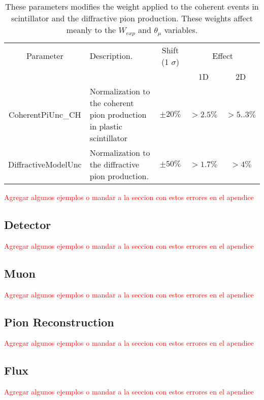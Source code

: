 \begin{table}[!htb]
    \centering
    \begin{tabular}{c|p{2in}|c|c|c}
        \hline 
        Parameter & Description.  & Shift (1 $\sigma$) & \multicolumn{2}{c}{Effect} \\
         & & & 1D & 2D \\
        \hline  
        CoherentPiUnc\_CH & Normalization to the coherent pion production in plastic scintillator & $\pm20\%$ & $>2.5\%$ & $>5..3\%$\\ \hline
        DiffractiveModelUnc & Normalization to the diffractive pion production. & $\pm50\%$ & $>1.7\%$ & $>4\%$ \\ \hline 
    \end{tabular}
    \caption{These parameters modifies the weight applied to the coherent events in scintillator and the diffractive pion production. These weights affect meanly to the $W_{exp}$ and $\theta_\mu$ variables.}
    \label{tab:ErrorAnalysis:SystematicUnc:CoherentandDifractive}
\end{table}





\textcolor{red}{Agregar algunos ejemplos o mandar a la seccion con estos errores en el apendice}
\subsection{Detector}
\label{Cap:ErrorAnalysis:SystematicUnc:Detector}
\textcolor{red}{Agregar algunos ejemplos o mandar a la seccion con estos errores en el apendice}
\subsection{Muon}
\label{Cap:ErrorAnalysis:SystematicUnc:Muon}
\textcolor{red}{Agregar algunos ejemplos o mandar a la seccion con estos errores en el apendice}
\subsection{Pion Reconstruction}
\label{Cap:ErrorAnalysis:SystematicUnc:PionReco}
\textcolor{red}{Agregar algunos ejemplos o mandar a la seccion con estos errores en el apendice}
\subsection{Flux}
\label{Cap:ErrorAnalysis:SystematicUnc:Flux}
\textcolor{red}{Agregar algunos ejemplos o mandar a la seccion con estos errores en el apendice}
